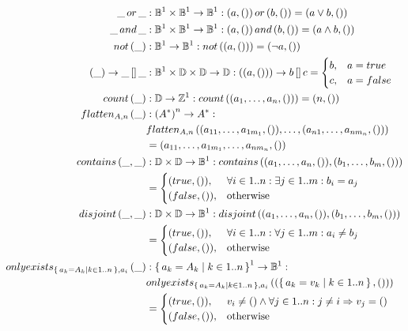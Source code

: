 \begin{defbox}
\begin{align*}
\_\,or\,\_ &: \mathbb{B}^1 \times \mathbb{B}^1 \to \mathbb{B}^1 : (a, ())\,or\,(b, ()) = (a \lor b, ()) \\
\_\,and\,\_ &: \mathbb{B}^1 \times \mathbb{B}^1 \to \mathbb{B}^1 : (a, ())\,and\,(b, ()) = (a \land b, ()) \\
not\left(\_\right) &: \mathbb{B}^1 \to \mathbb{B}^1 : not\left((a, ())\right) = (\lnot a, ()) \\
(\_) \rightarrow \_\,[]\,\_ &: \mathbb{B}^1 \times \mathbb{D} \times \mathbb{D} \to \mathbb{D} : ((a, ())) \rightarrow b\,[]\,c =
\begin{cases}
b, & a = true\\
c, & a = false
\end{cases} \\
count\left(\_\right) &: \mathbb{D} \to \mathbb{Z}^1 : count\left((a_1, \dots, a_n, ())\right) = (n, ()) \\
flatten_{A, n}\left(\_\right) &: \left(A^{*}\right)^n \to A^{*} : \\
&flatten_{A, n}\left((a_{11}, \dots, a_{1m_1}, ()), \dots, (a_{n1}, \dots, a_{nm_n}, ())\right) \\
&= (a_{11}, \dots, a_{1m_1}, \dots, a_{nm_n}, ()) \\
contains\left(\_, \_\right) &: \mathbb{D} \times \mathbb{D} \to \mathbb{B}^1 : contains\left((a_1, \dots, a_n, ()), (b_1, \dots, b_m, ())\right) \\
&= \begin{cases}
(true, ()), & \forall i \in 1..n : \exists j \in 1..m : b_i = a_j\\
(false, ()), & \text{otherwise}
\end{cases} \\
disjoint\left(\_, \_\right) &: \mathbb{D} \times \mathbb{D} \to \mathbb{B}^1 : disjoint\left((a_1, \dots, a_n, ()), (b_1, \dots, b_m, ())\right) \\
&= \begin{cases}
(true, ()), & \forall i \in 1..n : \forall j \in 1..m : a_i \neq b_j\\
(false, ()), & \text{otherwise}
\end{cases} \\
onlyexists_{\left\{\,a_k=A_k \mid k\in 1..n\,\right\}, a_i}\left(\_\right) &: \left\{\,a_k=A_k \mid k\in 1..n\,\right\}^1 \to \mathbb{B}^1 : \\ &onlyexists_{\left\{\,a_k=A_k \mid k\in 1..n\,\right\}, a_i}\left((\left\{\,a_k=v_k \mid k\in 1..n\,\right\}, ())\right) \\
&= \begin{cases}
(true, ()), & v_i \neq () \land \forall j \in 1..n : j \neq i \Rightarrow v_j = () \\
(false, ()), & \text{otherwise}

\end{cases}
\end{align*}
\end{defbox}
